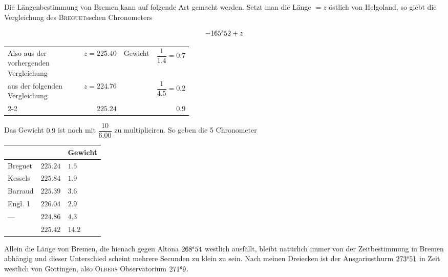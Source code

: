 Die Längenbestimmung von Bremen kann auf folgende Art gemacht werden. Setzt man die
Länge $=z$ östlich von Helgoland, so giebt die Vergleichung des \textsc{Breguet}sschen Chronometers

\[
-165^{\rm s}52+z
\]


\begin{center}\small
\begin{tabular}{p{0.42\linewidth} r l r}
Also aus der vorhergenden Vergleichung & $z=225.40$ & Gewicht & $\dfrac{1}{1.4}=0.7$ \\[5pt]
aus der folgenden Vergleichung & $z=224.76$ & & $\dfrac{1}{4.5}=0.2$ \\[8pt]
\cline{2-2}\cline{4-4}
 & $225.24$ & & $0.9$ \\
\end{tabular}
\end{center}

Das Gewicht $0.9$ ist noch mit $\dfrac{10}{6.00}$ zu multipliciren. So geben die 5 Chronometer

\begin{center}
\begin{tabular}{l|l|l}
 & & Gewicht \\
\hline
Breguet & $225.24$ & $1.5$ \\
Kessels & $225.84$ & $1.9$ \\
Barraud & $225.39$ & $3.6$ \\
Engl. 1 & $226.04$ & $2.9$ \\
---\quad 4 & $224.86$ & $4.3$ \\
\hline
 & $225.42$ & $14.2$ \\
\end{tabular}
\end{center}

Allein die Länge von Bremen, die hienach gegen Altona $268^{\rm s}54$ westlich ausfällt, bleibt natürlich immer von der Zeitbestimmung in Bremen abhängig und dieser Unterschied scheint mehrere Secunden zu klein zu sein. Nach meinen Dreiecken ist der Ansgariusthurm $273^{\rm s}51$ in Zeit westlich von
Göttingen, also \textsc{Olbers} Observatorium $271^{\rm s}9$.
